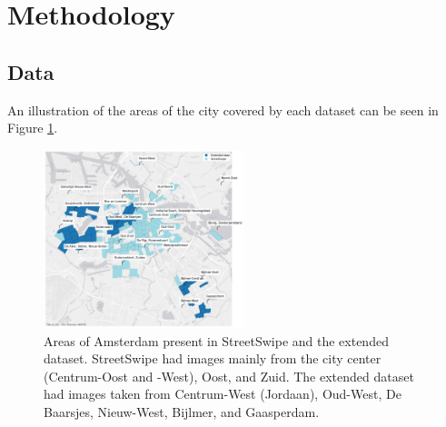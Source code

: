 \section{Methodology}
\label{sec:methodology}

\subsection{Data}

An illustration of the areas of the city covered by each dataset can be seen in Figure \ref{fig:map}.

{
\setlength\intextsep{0pt}
\begin{figure}[h!]
    \includegraphics[width=0.52\textwidth]{media/methodology/map/map3.png}
    \caption{Areas of Amsterdam present in StreetSwipe and the extended dataset. StreetSwipe had images mainly from the city center (Centrum-Oost and -West), Oost, and Zuid. The extended dataset had images taken from Centrum-West (Jordaan), Oud-West, De Baarsjes, Nieuw-West, Bijlmer, and Gaasperdam.}
    \label{fig:map}
\end{figure}
}

